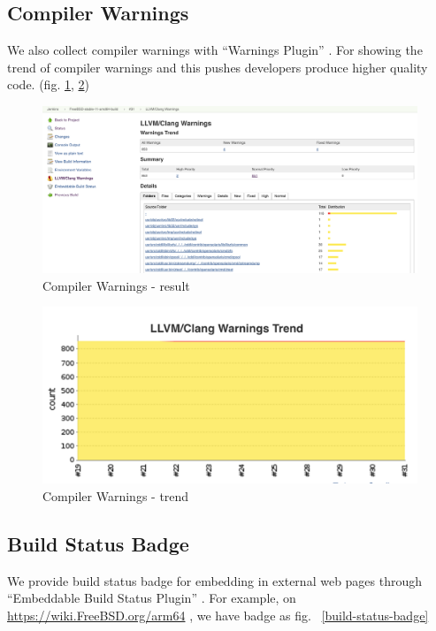 \documentclass[a4paper,twocolumn,10pt]{article}
\begin{document}
\subsection{Compiler Warnings}

We also collect compiler warnings with ``Warnings Plugin''
\cite{jenkins-warnings-plugin}. For showing the trend of compiler
warnings and this pushes developers produce higher quality code. (fig.
\ref{compiler-result}, \ref{compiler-trend})

\begin{figure}
\includegraphics[width=\textwidth]{compiler-result.png}
\caption{Compiler Warnings - result}
\label{compiler-result}
\end{figure}

\begin{figure}
\includegraphics{compiler-trend.png}
\caption{Compiler Warnings - trend}
\label{compiler-trend}
\end{figure}

\subsection{Build Status Badge}

We provide build status badge for embedding in external web pages through
``Embeddable Build Status Plugin''
\cite{jenkins-embeddable-build-status-plugin}. For example, on
\url{https://wiki.FreeBSD.org/arm64} , we have badge as fig.
~\ref{build-status-badge}
\end{document}
